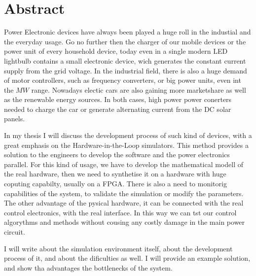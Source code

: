 \chapter*{Abstract}

Power Electronic devices have always been played a huge roll in the industial and the everyday usage. Go no further then the charger of our mobile devices or the power unit of every household device, today even in a single modern LED lightbulb contains a small electronic device, wich generates the constant current supply from the grid voltage. In the industrial field, there is also a huge demand of motor controllers, such as frequency converters, or big power units, even int the $MW$ range. Nowadays electic cars are also gaining more marketshare as well as the renewable energy sources. In both cases, high power power conerters needed to charge the car or generate alternating current from the DC solar panels.

In my thesis I will discuss the development process of such kind of devices, with a great emphasis on the Hardware-in-the-Loop simulators. This method provides a solution to the engineers to develop the software and the power electronics parallel. For this kind of usage, we have to develop the mathematical modell of the real hardware, then we need to synthetise it on a hardware with huge coputing capabilty, usually on a FPGA. There is also a need to monitorig capabilities of the system, to validate the simulation or modify the parameters. The other advantage of the pysical hardware, it can be connected with the real control electronics, with the real interface. In this way we can tst our control algorythms and methods without cousing any costly damage in the main power circuit. 

I will write about the simulation environment itself, about the development process of it, and about the dificulties as well. I will provide an example solution, and show tha advantages the bottlenecks of the system.


\vfill
\selectthesislanguage

\setcounter{romanPage}{\value{page}}

